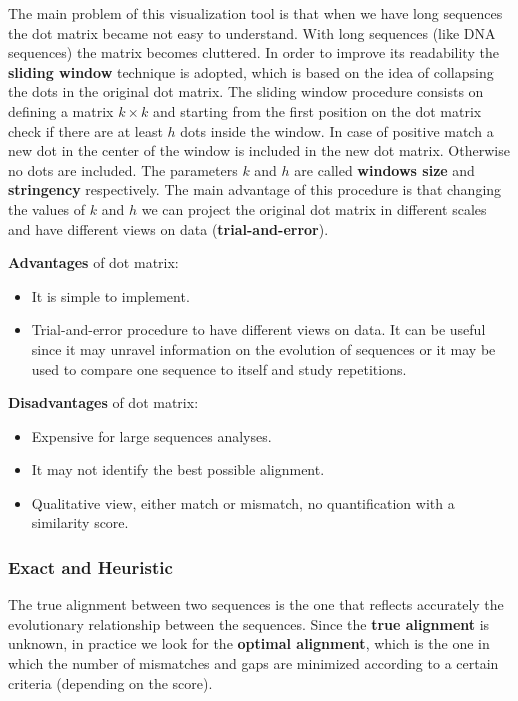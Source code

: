 The main problem of this visualization tool is that when we have long sequences the dot matrix became not easy to understand. With long sequences (like DNA sequences) the matrix becomes cluttered. In order to improve its readability the \textbf{sliding window} technique is adopted, which is based on the idea of collapsing the dots in the original dot matrix. The sliding window procedure consists on defining a matrix $k\times k$ and starting from the first position on the dot matrix check if there are at least $h$ dots inside the window. In case of positive match a new dot in the center of the window is included in the new dot matrix. Otherwise no dots are included. The parameters $k$ and $h$ are called \textbf{windows size} and \textbf{stringency} respectively. The main advantage of this procedure is that changing the values of $k$ and $h$ we can project the original dot matrix in different scales and have different views on data (\textbf{trial-and-error}).


\textbf{Advantages} of dot matrix:
\begin{itemize}
	\item It is simple to implement.
	\item Trial-and-error procedure to have different views on data. It can be useful since it may unravel information on the evolution of sequences or it may be used to compare one sequence to itself and study repetitions. 
\end{itemize}

\textbf{Disadvantages} of dot matrix:
\begin{itemize}
	\item Expensive for large sequences analyses.
	\item It may not identify the best possible alignment.
	\item Qualitative view, either match or mismatch, no quantification with a similarity score.
\end{itemize}

\subsubsection{Exact and Heuristic}
The true alignment between two sequences is the one that reflects accurately the evolutionary relationship between the sequences. Since the \textbf{true alignment} is unknown, in practice we look for the \textbf{optimal alignment}, which is the one in which the number of mismatches and gaps are minimized according to a certain criteria (depending on the score).\\

